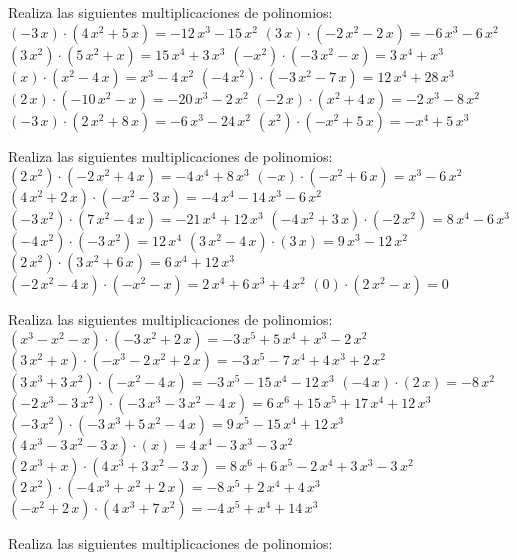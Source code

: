 \item[Ejercicio4] Realiza las siguientes multiplicaciones de polinomios: \\ \subitem [0]$ ( -3 \, x ) · ( 4 \, x^{2} + 5 \, x ) = -12 \, x^{3} - 15 \, x^{2} $ \subitem [1]$ ( 3 \, x ) · ( -2 \, x^{2} - 2 \, x ) = -6 \, x^{3} - 6 \, x^{2} $ \subitem [2]$ ( 3 \, x^{2} ) · ( 5 \, x^{2} + x ) = 15 \, x^{4} + 3 \, x^{3} $ \subitem [3]$ ( -x^{2} ) · ( -3 \, x^{2} - x ) = 3 \, x^{4} + x^{3} $ \subitem [4]$ ( x ) · ( x^{2} - 4 \, x ) = x^{3} - 4 \, x^{2} $ \subitem [5]$ ( -4 \, x^{2} ) · ( -3 \, x^{2} - 7 \, x ) = 12 \, x^{4} + 28 \, x^{3} $ \subitem [6]$ ( 2 \, x ) · ( -10 \, x^{2} - x ) = -20 \, x^{3} - 2 \, x^{2} $ \subitem [7]$ ( -2 \, x ) · ( x^{2} + 4 \, x ) = -2 \, x^{3} - 8 \, x^{2} $ \subitem [8]$ ( -3 \, x ) · ( 2 \, x^{2} + 8 \, x ) = -6 \, x^{3} - 24 \, x^{2} $ \subitem [9]$ ( x^{2} ) · ( -x^{2} + 5 \, x ) = -x^{4} + 5 \, x^{3} $ \item[Ejercicio5] Realiza las siguientes multiplicaciones de polinomios: \\ \subitem [0]$ ( 2 \, x^{2} ) · ( -2 \, x^{2} + 4 \, x ) = -4 \, x^{4} + 8 \, x^{3} $ \subitem [1]$ ( -x ) · ( -x^{2} + 6 \, x ) = x^{3} - 6 \, x^{2} $ \subitem [2]$ ( 4 \, x^{2} + 2 \, x ) · ( -x^{2} - 3 \, x ) = -4 \, x^{4} - 14 \, x^{3} - 6 \, x^{2} $ \subitem [3]$ ( -3 \, x^{2} ) · ( 7 \, x^{2} - 4 \, x ) = -21 \, x^{4} + 12 \, x^{3} $ \subitem [4]$ ( -4 \, x^{2} + 3 \, x ) · ( -2 \, x^{2} ) = 8 \, x^{4} - 6 \, x^{3} $ \subitem [5]$ ( -4 \, x^{2} ) · ( -3 \, x^{2} ) = 12 \, x^{4} $ \subitem [6]$ ( 3 \, x^{2} - 4 \, x ) · ( 3 \, x ) = 9 \, x^{3} - 12 \, x^{2} $ \subitem [7]$ ( 2 \, x^{2} ) · ( 3 \, x^{2} + 6 \, x ) = 6 \, x^{4} + 12 \, x^{3} $ \subitem [8]$ ( -2 \, x^{2} - 4 \, x ) · ( -x^{2} - x ) = 2 \, x^{4} + 6 \, x^{3} + 4 \, x^{2} $ \subitem [9]$ ( 0 ) · ( 2 \, x^{2} - x ) = 0 $ \item[Ejercicio6] Realiza las siguientes multiplicaciones de polinomios: \\ \subitem [0]$ ( x^{3} - x^{2} - x ) · ( -3 \, x^{2} + 2 \, x ) = -3 \, x^{5} + 5 \, x^{4} + x^{3} - 2 \, x^{2} $ \subitem [1]$ ( 3 \, x^{2} + x ) · ( -x^{3} - 2 \, x^{2} + 2 \, x ) = -3 \, x^{5} - 7 \, x^{4} + 4 \, x^{3} + 2 \, x^{2} $ \subitem [2]$ ( 3 \, x^{3} + 3 \, x^{2} ) · ( -x^{2} - 4 \, x ) = -3 \, x^{5} - 15 \, x^{4} - 12 \, x^{3} $ \subitem [3]$ ( -4 \, x ) · ( 2 \, x ) = -8 \, x^{2} $ \subitem [4]$ ( -2 \, x^{3} - 3 \, x^{2} ) · ( -3 \, x^{3} - 3 \, x^{2} - 4 \, x ) = 6 \, x^{6} + 15 \, x^{5} + 17 \, x^{4} + 12 \, x^{3} $ \subitem [5]$ ( -3 \, x^{2} ) · ( -3 \, x^{3} + 5 \, x^{2} - 4 \, x ) = 9 \, x^{5} - 15 \, x^{4} + 12 \, x^{3} $ \subitem [6]$ ( 4 \, x^{3} - 3 \, x^{2} - 3 \, x ) · ( x ) = 4 \, x^{4} - 3 \, x^{3} - 3 \, x^{2} $ \subitem [7]$ ( 2 \, x^{3} + x ) · ( 4 \, x^{3} + 3 \, x^{2} - 3 \, x ) = 8 \, x^{6} + 6 \, x^{5} - 2 \, x^{4} + 3 \, x^{3} - 3 \, x^{2} $ \subitem [8]$ ( 2 \, x^{2} ) · ( -4 \, x^{3} + x^{2} + 2 \, x ) = -8 \, x^{5} + 2 \, x^{4} + 4 \, x^{3} $ \subitem [9]$ ( -x^{2} + 2 \, x ) · ( 4 \, x^{3} + 7 \, x^{2} ) = -4 \, x^{5} + x^{4} + 14 \, x^{3} $ \item[Ejercicio7] Realiza las siguientes multiplicaciones de polinomios: 